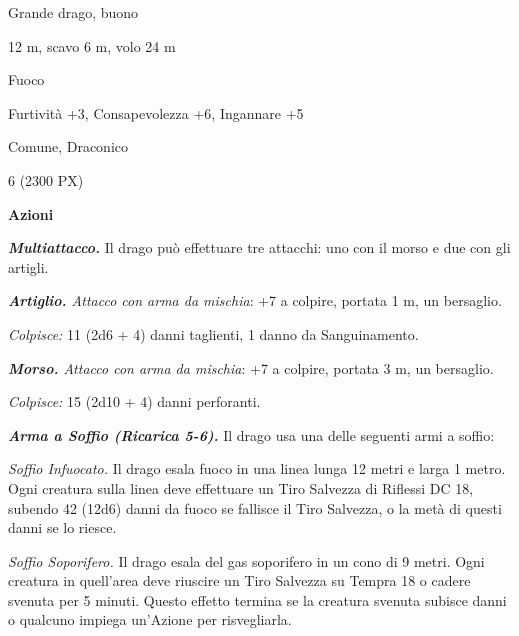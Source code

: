 \begin{multicols}{2}
{
\begin{description}[noitemsep, topsep=0pt, parsep=0pt, partopsep=0pt, itemsep=1pt, leftmargin=2.35cm,  labelwidth=2.2cm, itemindent=0cm, listparindent=0pt] %
\setlength{\baselineskip}{10pt}
\item[\textbf{Taglia/Tipo}] Grande drago, buono
\item[\textbf{Caratt.}] 
\item[\textbf{Punti Ferita}] 
\item[\textbf{Movimento}] 12 m, scavo 6 m, volo 24 m
\item[\textbf{Tiri Salvez.}] 
\item[\textbf{Imm. Danni}] Fuoco
\item[\textbf{Comp.}] Furtività +3, Consapevolezza +6, Ingannare +5
\item[\textbf{Sensi}] 
\item[\textbf{Linguaggi}] Comune, Draconico
\item[\textbf{Sfida}] 6 (2300 PX)
\end{description}
\smallskip

\textbf{Azioni}

\emph{\textbf{Multiattacco.}} Il drago può effettuare tre attacchi: uno con il morso e due con gli artigli.

\emph{\textbf{Artiglio.} Attacco con arma da mischia}: +7 a colpire, portata 1 m, un bersaglio.

\emph{Colpisce:} 11 (2d6 + 4) danni taglienti, 1 danno da Sanguinamento.

\emph{\textbf{Morso.} Attacco con arma da mischia}: +7 a colpire, portata 3 m, un bersaglio.

\emph{Colpisce:} 15 (2d10 + 4) danni perforanti.

\emph{\textbf{Arma a Soffio (Ricarica 5-6).}} Il drago usa una delle seguenti armi a soffio:

\emph{Soffio Infuocato.} Il drago esala fuoco in una linea lunga 12 metri e larga 1 metro. Ogni creatura sulla linea deve effettuare un Tiro Salvezza di Riflessi DC 18, subendo 42 (12d6) danni da fuoco se fallisce il Tiro Salvezza, o la metà di questi danni se lo riesce.

\emph{Soffio Soporifero.} Il drago esala del gas soporifero in un cono di 9 metri. Ogni creatura in quell'area deve riuscire un Tiro Salvezza su Tempra 18 o cadere svenuta per 5 minuti. Questo effetto termina se la creatura svenuta subisce danni o qualcuno impiega un'Azione per risvegliarla.

}
\end{multicols}
